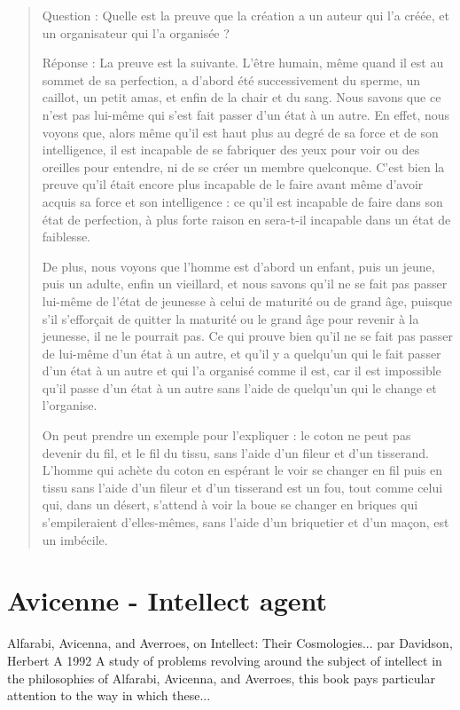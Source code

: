 \begin{quote}
   Question : Quelle est la preuve que la création a un auteur qui l'a
créée, et un organisateur qui l'a organisée ?

Réponse : La preuve est la suivante. L'être humain, même quand il est au
sommet de sa perfection, a d'abord été successivement du sperme, un
caillot, un petit amas, et enfin de la chair et du sang. Nous savons que
ce n'est pas lui-même qui s'est fait passer d'un état à un autre. En
effet, nous voyons que, alors même qu'il est haut plus au degré de sa
force et de son intelligence, il est incapable de se fabriquer des yeux
pour voir ou des oreilles pour entendre, ni de se créer un membre
quelconque. C'est bien la preuve qu'il était encore plus incapable de le
faire avant même d'avoir acquis sa force et son intelligence : ce qu'il
est incapable de faire dans son état de perfection, à plus forte raison
en sera-t-il incapable dans un état de faiblesse.

De plus, nous voyons que l'homme est d'abord un enfant, puis un jeune,
puis un adulte, enfin un vieillard, et nous savons qu'il ne se fait pas
passer lui-même de l'état de jeunesse à celui de maturité ou de grand
âge, puisque s'il s'efforçait de quitter la maturité ou le grand âge
pour revenir à la jeunesse, il ne le pourrait pas. Ce qui prouve bien
qu'il ne se fait pas passer de lui-même d'un état à un autre, et qu'il y
a quelqu'un qui le fait passer d'un état à un autre et qui l'a organisé
comme il est, car il est impossible qu'il passe d'un état à un autre
sans l'aide de quelqu'un qui le change et l'organise.

On peut prendre un exemple pour l'expliquer : le coton ne peut pas
devenir du fil, et le fil du tissu, sans l'aide d'un fileur et d'un
tisserand. L'homme qui achète du coton en espérant le voir se changer en
fil puis en tissu sans l'aide d'un fileur et d'un tisserand est un fou,
tout comme celui qui, dans un désert, s'attend à voir la boue se changer
en briques qui s'empileraient d'elles-mêmes, sans l'aide d'un briquetier
et d'un maçon, est un imbécile. 
\end{quote}

\section{Avicenne - Intellect agent}

Alfarabi, Avicenna, and Averroes, on Intellect: Their Cosmologies...
par Davidson, Herbert A
1992
A study of problems revolving around the subject of intellect in the philosophies of Alfarabi, Avicenna, and Averroes, this book pays particular attention to the way in which these...

